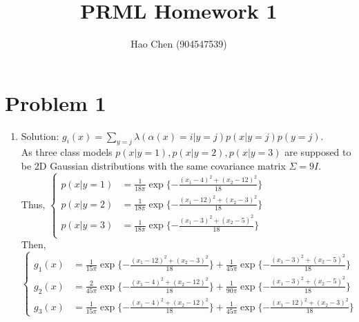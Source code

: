 \documentclass[12pt]{ctexart}
\title{	
\normalfont \normalsize 
\huge PRML Homework 1\\ %
}
\author{Hao Chen (904547539)} %
\begin{document}
\maketitle

\section{Problem 1}
\begin{enumerate}
\item 
Solution: 
$g_i(x)  = \sum_{y=j} \lambda(\alpha(x)=i | y=j)p(x|y=j)p(y=j)$. \\
As three class models $p(x|y=1), p(x|y=2), p(x|y=3)$ are supposed to be 2D Gaussian distributions with the same covariance matrix $\Sigma=9I$. \\
Thus, 
$\left\{
  \begin{array}{ll}
    p(x | y=1)&= \frac{1}{18\pi} \exp\{-\frac{(x_1-4)^2+(x_2-12)^2}{18}\} \\
    p(x | y=2)&= \frac{1}{18\pi}  \exp\{-\frac{(x_1-12)^2+(x_2-3)^2}{18}\} \\
    p(x | y=3)&= \frac{1}{18\pi}  \exp\{-\frac{(x_1-3)^2+(x_2-5)^2}{18}\} \\
  \end{array}
\right.$ \\
Then, 
$\left\{
  \begin{array}{ll}
    g_1(x)&= \frac{1}{15\pi}  \exp\{-\frac{(x_1-12)^2+(x_2-3)^2}{18}\} + \frac{1}{45\pi}  \exp\{-\frac{(x_1-3)^2+(x_2-5)^2}{18}\}  \\
    g_2(x)&= \frac{2}{45\pi} \exp\{-\frac{(x_1-4)^2+(x_2-12)^2}{18}\} + \frac{1}{90\pi}  \exp\{-\frac{(x_1-3)^2+(x_2-5)^2}{18}\} \\
    g_3(x)&= \frac{1}{15\pi} \exp\{-\frac{(x_1-4)^2+(x_2-12)^2}{18}\} + \frac{1}{45\pi}  \exp\{-\frac{(x_1-12)^2+(x_2-3)^2}{18}\}
  \end{array} 
\right. $ \\


\end{enumerate}
\end{document}
